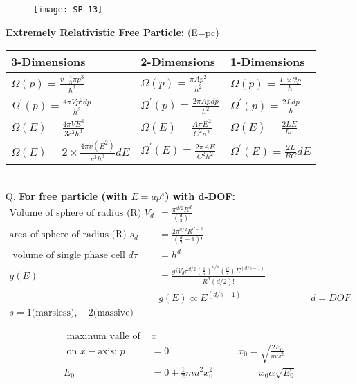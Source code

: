 \begin{figure}[H]
	\texttt{[image: SP-13]}
\end{figure}
\textbf{Extremely Relativistic Free Particle: }(E=pc)\\
\renewcommand*{\arraystretch}{1.8}
\begin{tabular}{|p{4cm}|p{4cm}|p{4cm}|}
	\hline
	3-Dimensions & 2-Dimensions & 1-Dimensions\\\hline
	$\Omega(p)=\frac{v \cdot \frac{4}{3} \pi p^{3}}{h^{3}}$&$\Omega(p)=\frac{\pi A p^{2}}{h^{2}}$&$\Omega(p)=\frac{L \times 2 p}{h}$\\
	$\Omega^{\prime}(p)=\frac{4 \pi V p^{2} d p}{h^{3}}$&$\Omega^{\prime}(p)=\frac{2 \pi A p d p}{h^{2}}$&$\Omega^{\prime}(p)=\frac{2 L d p}{h}$\\\hline
	$\Omega(E)=\frac{4 \pi V E^{3}}{3 c^{3} h^{3}}$&$\Omega(E)=\frac{A \pi E^{2}}{C^{2} n^{2}}$&$\Omega(E)=\frac{2 L E}{\hbar c}$\\
	$\Omega(E)=2 \times \frac{4 \pi v\left(E^{2}\right)}{c^{3} h^{3}} d E$&$\Omega^{\prime}(E)=\frac{2 \pi A E}{C^{2} h^{2}}$&$\Omega^{\prime}(E)=\frac{2 L}{R C} d E$\\\hline
\end{tabular}\\
Q. \textbf{For free particle (with $E=ap^s$) with d-DOF: }\\
\begin{align*}
\text{Volume of sphere of radius (R) }V_{d}&=\frac{\pi^{d / 2} R^{d}}{\left(\frac{d}{2}\right) !}\\
\text{area of sphere of radius (R) }s_{d}&=\frac{2 \pi^{d / 2} R^{d-1}}{\left(\frac{d}{2}-1\right) !}\\
\text{ volume of single phase cell }d \tau&=h^{d}\\
g(E)&=\frac{g i V_{d} \pi^{d / 2}\left(\frac{1}{a}\right)^{d / s}\left(\frac{d}{s}\right) E^{(d / s-1)}}{R^{d}(d / 2) !}\\
&g(E) \propto E^{(d / s-1)}\hspace{3cm}d=DOF\\
s=1 \text{(marsless)},\quad
2 \text{(massive)}
\end{align*}
\begin{note}
	\begin{align*}
	\text{	maxinum valle of }&x \\
	\text{	on }x-\text{axis: }p&=0 \hspace{3cm}x_{0}=\sqrt{\frac{2 E_{0}}{m \omega^{2}}}\\
	E_{0}&=0+\frac{1}{2} m u^{2} x_{0}^{2}\hspace{2cm}x_{0} \alpha \sqrt{E_{0}}\\
	\end{align*}
\end{note}
